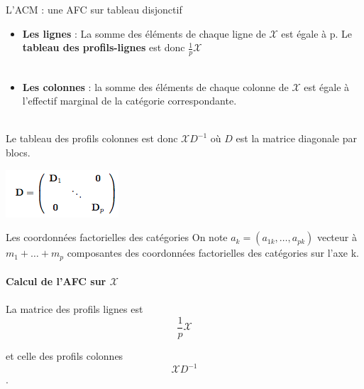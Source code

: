 \documentclass[11pt]{beamer}
\begin{document}
\begin{frame}{L'ACM : une AFC sur tableau disjonctif}

 \begin{itemize}
 \item \textbf{Les lignes }:  La somme des éléments de chaque ligne de $\mathcal{X}$
est égale à p. Le \textbf{tableau des profils-lignes} est donc $\frac{1}{p} \mathcal{X}$\\~\\


\item \textbf{Les colonnes} : la somme des éléments de chaque colonne de $\mathcal{X}$ est égale à l'effectif marginal de la catégorie correspondante.\\~\\
 \end{itemize}

Le tableau des profils colonnes est donc $\mathcal{X}D^{-1}$
où $D$ est la matrice diagonale par blocs.

\centering

\includegraphics[scale=0.8]{Disj6} 

\end{frame}



\begin{frame}{Les coordonnées factorielles des catégories}
\centering 
 On note $a_k = (a_{1k}, \ldots , a_{pk})$ vecteur à $m_1 + \ldots + m_p$ composantes des coordonnées factorielles des catégories sur l'axe k. \\~\\
 
 \textbf{Calcul de l'AFC sur $\mathcal{X}$  }\\~\\
 
La matrice des profils lignes est $$\frac{1}{p} \mathcal{X}$$

et  celle des profils colonnes $$\mathcal{X}D^{-1}$$ . 

 
 
\end{frame}


\end{document}
